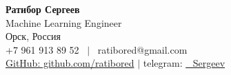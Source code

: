 \documentclass[letterpaper,12pt,english,russian]{fed-res} %
\begin{document}
\begin{center}
    \textbf{\Huge Ратибор Сергеев} \\ \vspace{1pt}
    Machine Learning Engineer \\ \vspace{1pt}
    Орск, Россия \\ \vspace{1pt}
    +7 961 913 89 52 \ $|$ \ ratibored@gmail.com \\ \vspace{1pt}
    \href{https://github.com/ratibored}{GitHub: github.com/ratibored} $|$ telegram: \href{https://t.me/Ratibor_Sergeev}{\@Ratibor\_Sergeev} \\ \vspace{1pt}
\end{center}







\end{document}
